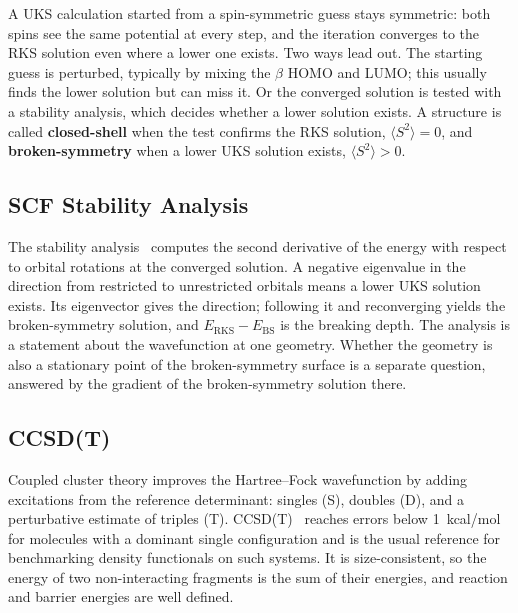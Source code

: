 A UKS calculation started from a spin-symmetric guess stays symmetric: both
spins see the same potential at every step, and the iteration converges to
the RKS solution even where a lower one exists. Two ways lead out. The
starting guess is perturbed, typically by mixing the $\beta$ HOMO and LUMO;
this usually finds the lower solution but can miss it. Or the converged
solution is tested with a stability analysis, which decides whether a lower
solution exists. A structure is called \textbf{closed-shell} when the test
confirms the RKS solution, $\langle S^2 \rangle = 0$, and
\textbf{broken-symmetry} when a lower UKS solution exists, $\langle S^2
\rangle > 0$.

\subsection{SCF Stability Analysis}
\label{sec:background-stability}

The stability analysis~\cite{cizek1967, seeger1977} computes the second
derivative of the energy with respect to orbital rotations at the converged
solution. A negative eigenvalue in the direction from restricted to
unrestricted orbitals means a lower UKS solution exists. Its eigenvector
gives the direction; following it and reconverging yields the
broken-symmetry solution, and $E_\mathrm{RKS} - E_\mathrm{BS}$ is the
breaking depth. The analysis is a statement about the wavefunction at one
geometry. Whether the geometry is also a stationary point of the
broken-symmetry surface is a separate question, answered by the gradient of
the broken-symmetry solution there.

\subsection{CCSD(T)}
\label{sec:background-ccsdt}

Coupled cluster theory improves the Hartree--Fock wavefunction by adding
excitations from the reference determinant: singles (S), doubles (D), and a
perturbative estimate of triples (T). \mbox{CCSD(T)}~\cite{raghavachari1989}
reaches errors below 1~kcal/mol for molecules with a dominant single
configuration and is the usual reference for benchmarking density functionals
on such systems. It is size-consistent, so the energy of two non-interacting
fragments is the sum of their energies, and reaction and barrier energies are
well defined.

